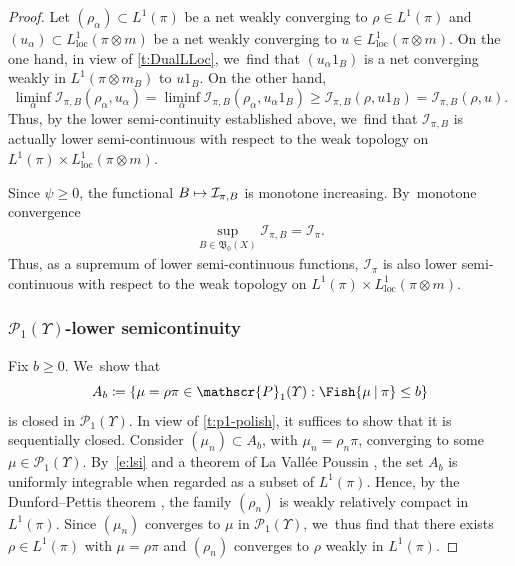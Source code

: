 \documentclass[JEP,XML,SOM,Unicode,published]{cedram}
\newcommand\mto{\mathchoice{\longmapsto}{\mapsto}{\mapsto}{\mapsto}}
\theoremstyle{definition}
\theoremstyle{remark}
\DeclarePairedDelimiter{\set}{\lbrace}{\rbrace}
\newcommand{\given}[1][]{%
\nonscript\:#1\vert
\allowbreak
\nonscript\:
\mathopen{}}
\begin{document}
\begin{proof}
Let $(\rho_{\alpha}) \subset L^{1}(\pi)$ be a net weakly converging to $\rho \in L^{1}(\pi)$ and $(u_{\alpha}) \subset L^1_{\mathrm{loc}}(\pi\otimes m)$ be a net weakly converging to $u\in L^1_{\mathrm{loc}}(\pi\otimes m)$.
On the one hand, in view of \cref{t:DualLLoc}, we~find that $(u_{\alpha} 1_{B})$ is a net converging weakly in $L^{1}(\pi \otimes m_{B})$ to $u 1_{B}$.
On the other hand,
\begin{equation*}
\liminf_{\alpha} \mathcal{I}_{\pi,B}(\rho_{\alpha}, u_{\alpha}) = \liminf_{\alpha} \mathcal{I}_{\pi,B}(\rho_{\alpha}, u_{\alpha} 1_{B}) \geq \mathcal{I}_{\pi,B}(\rho, u 1_{B}) = \mathcal{I}_{\pi,B}(\rho, u).
\end{equation*}
Thus, by the lower semi-continuity established above, we~find that $\mathcal{I}_{\pi,B}$ is actually lower semi-continuous with respect to the weak topology on $L^{1}(\pi) \times L^{1}_{\mathrm{loc}}(\pi \otimes m)$.

Since $\psi\geq 0$, the functional $B\mto \mathcal{I}_{\pi,B}$ is monotone increasing.
By~monotone convergence
\begin{align}\label{e:restricted-fisher}
\sup_{B\in\mathfrak{B}_0(X)} \mathcal{I}_{\pi,B} = \mathcal{I}_{\pi}.
\end{align}
Thus, as a supremum of lower semi-continuous functions, $\mathcal{I}_{\pi}$ is also lower semi-continuous with respect to the weak topology on $L^{1}(\pi) \times L^{1}_{\mathrm{loc}}(\pi \otimes m)$.

\subsubsection*{$\mathscr{P}_1(\varUpsilon)$-lower semicontinuity}
Fix $b \geq 0$. We~show that
\begin{equation*}
A_b \coloneq \set*{ \mu =\rho\pi \in \mathscr{P}_{1}(\varUpsilon) : \Fish{ \mu \given \pi } \leq b }
\end{equation*}
is closed in $\mathscr{P}_{1}(\varUpsilon)$.
In view of \cref{t:p1-polish}, it suffices to show that it is sequentially closed.
Consider $(\mu_{n}) \subset A_b$, with $\mu_n= \rho_n\pi$, converging to some $\mu \in \mathscr{P}_{1}(\varUpsilon)$.
By~\cref{e:lsi} and a theorem of La Vallée Poussin \cite[Th.\,22, p.\,38]{DellacherieMeyer}, the set $A_b$ is uniformly integrable when regarded as a subset of $L^1(\pi)$.
Hence, by the Dunford--Pettis theorem \cite[Th.\,25, p.\,43]{DellacherieMeyer}, the family $(\rho_{n})$ is weakly relatively compact in $L^{1}(\pi)$.
Since $(\mu_{n})$ converges to $\mu$ in $\mathscr{P}_{1}(\varUpsilon)$, we~thus find that there exists $\rho \in L^{1}(\pi)$ with $\mu = \rho \pi$ and $(\rho_{n})$ converges to $\rho$ weakly in $L^{1}(\pi)$.


\end{proof}
\end{document}

